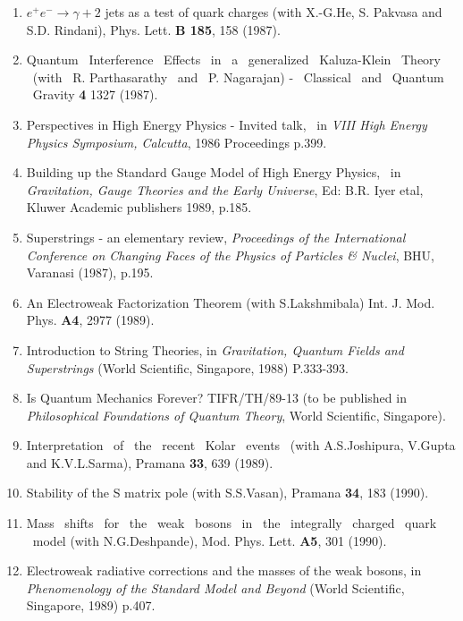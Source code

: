 \begin{enumerate}
\item $e^+e^- \rightarrow \gamma + 2$ jets as a test of quark charges
(with X.-G.He, S. Pakvasa and S.D. Rindani), Phys. Lett. {\bf B 185},
158 (1987).

\item Quantum \ Interference \ Effects \ in \ a \ generalized \ Kaluza-Klein \
Theory
\ (with \ R. Parthasarathy \ and \ P. Nagarajan) - \ Classical \ and \ Quantum \ Gravity
{\bf 4} 1327 (1987).

\item Perspectives in High Energy Physics - Invited talk, \ in {\it VIII High
Energy Physics Symposium, Calcutta}, 1986 Proceedings p.399.

\item Building up the Standard Gauge Model of High Energy Physics, \ in
{\it Gravitation, Gauge Theories and the Early Universe}, Ed: B.R. Iyer etal,
Kluwer Academic publishers 1989, p.185.

\item Superstrings - an elementary review, {\it Proceedings of the
International Conference on Changing Faces of the Physics of Particles \&
Nuclei}, BHU, Varanasi (1987), p.195.

\item An Electroweak Factorization Theorem (with S.Lakshmibala)
Int. J. Mod. Phys. {\bf A4}, 2977 (1989).

\item Introduction to String Theories, in {\it Gravitation, Quantum
Fields and Superstrings} (World Scientific, Singapore, 1988) P.333-393.

\item Is Quantum Mechanics Forever? TIFR/TH/89-13 (to be published
in {\it Philosophical Foundations of Quantum Theory}, World Scientific,
Singapore).

\item Interpretation \ of \ the \ recent \ Kolar \ events \ (with
A.S.Joshipura, V.Gupta and K.V.L.Sarma), Pramana {\bf 33}, 639 (1989).

\item Stability of the S matrix pole (with S.S.Vasan), Pramana {\bf
34}, 183 (1990).

\item Mass \ shifts \ for \ the \ weak \ bosons \ in \ the \ integrally \
charged
\ quark \ model (with N.G.Deshpande), Mod. Phys. Lett. {\bf A5}, 301 (1990).

\item Electroweak radiative corrections and the masses of the weak
bosons, in {\it Phenomenology of the Standard Model and Beyond} (World
Scientific, Singapore, 1989) p.407.


\end{enumerate}
